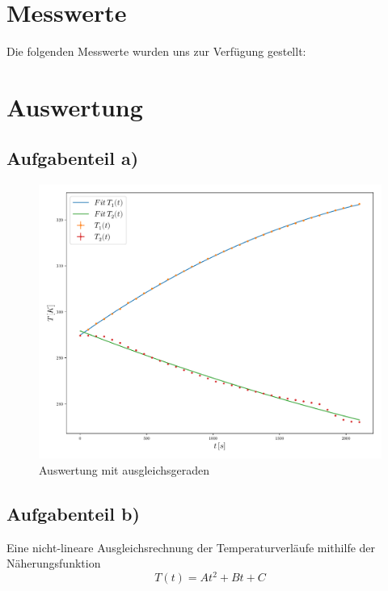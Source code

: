 \newpage
    \section{Messwerte}
    Die folgenden Messwerte wurden uns zur Verfügung gestellt:
    

    \newpage
    \section{Auswertung}
        \subsection{Aufgabenteil a)}
        \begin{figure}
               \centering
               \includegraphics[width=\textwidth]{grafic.pdf}
               \caption{Auswertung mit ausgleichsgeraden}
               \label{fig:grafic}
        \end{figure}


            
        \newpage
        \subsection{Aufgabenteil b)}

        Eine nicht-lineare Ausgleichsrechnung der Temperaturverläufe mithilfe der Näherungsfunktion
        \begin{equation}
        T(t)=At^2 + Bt + C
        \end{equation}

